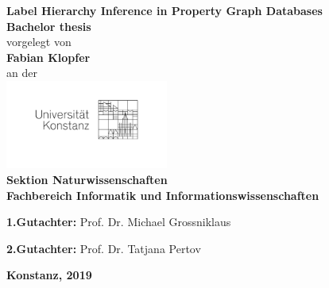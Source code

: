 \begin{titlepage}
    \begin{center}
        {\LARGE \textbf{Label Hierarchy Inference in Property Graph Databases}}
        \\[1cm]
        {\Large \textbf{Bachelor thesis}}
        \\[1cm]
        {\Large vorgelegt von}
        \\[0.5cm]
        {\LARGE \textbf{Fabian Klopfer}}
        \\[0.5cm]
        {\Large an der}
        \\[0.5cm]
        \includegraphics[width=0.4\textwidth]{img/logo_unikn.png}
        \\[1cm]
        {\Large \textbf{Sektion Naturwissenschaften}}
        \\[1cm]
        {\Large \textbf{Fachbereich Informatik und Informationswissenschaften}}
        \\[2cm]
        \begin{minipage}[c]{0.8\textwidth}
            \begin{description}[style=multiline]
                \item {\Large \textbf{1.Gutachter:} Prof. Dr. Michael Grossniklaus}
                \item {\Large \textbf{2.Gutachter:} Prof. Dr. Tatjana Pertov}
            \end{description}
        \end{minipage}
        \vfill
        {\LARGE \textbf{Konstanz, 2019}}
    \end{center}
\end{titlepage}